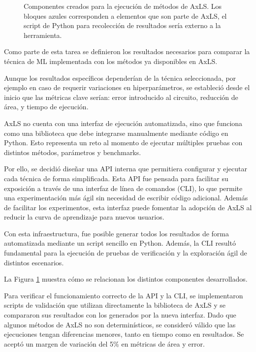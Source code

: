 \begin{figure}[htb]
  \begin{center}
    
  \end{center}
  \caption{Componentes creados para la ejecución de métodos de AxLS. Los bloques azules corresponden a elementos que son parte de AxLS, el script de Python para recolección de resultados sería externo a la herramienta.}
  \label{fig:runner}
\end{figure}

Como parte de esta tarea se definieron los resultados necesarios para comparar
la técnica de ML implementada con los métodos ya disponibles en AxLS.

Aunque los resultados específicos dependerían de la técnica seleccionada, por
ejemplo en caso de requerir variaciones en hiperparámetros, se estableció
desde el inicio que las métricas clave serían: error introducido al circuito,
reducción de área, y tiempo de ejecución.

AxLS no cuenta con una interfaz de ejecución automatizada, sino que funciona
como una biblioteca que debe integrarse manualmente mediante código en Python.
Esto representa un reto al momento de ejecutar múltiples pruebas con distintos
métodos, parámetros y benchmarks.

Por ello, se decidió diseñar una API interna que permitiera configurar y
ejecutar cada técnica de forma simplificada. Esta API fue pensada para
facilitar su exposición a través de una interfaz de línea de comandos (CLI), lo
que permite una experimentación más ágil sin necesidad de escribir código
adicional. Además de facilitar los experimentos, esta interfaz puede fomentar
la adopción de AxLS al reducir la curva de aprendizaje para nuevos usuarios.

Con esta infraestructura, fue posible generar todos los resultados de forma
automatizada mediante un script sencillo en Python.
Además, la CLI resultó fundamental para la ejecución de pruebas de verificación
y la exploración ágil de distintos escenarios.

La Figura \ref{fig:runner} muestra cómo se relacionan los distintos componentes
desarrollados.

Para verificar el funcionamiento correcto de la API y la CLI, se implementaron
scripts de validación que utilizan directamente la biblioteca de AxLS y se
compararon sus resultados con los generados por la nueva interfaz. Dado que
algunos métodos de AxLS no son determinísticos, se consideró válido que las
ejecuciones tengan diferencias menores, tanto en tiempo como en resultados. Se
aceptó un margen de variación del 5\% en métricas de área y error.

